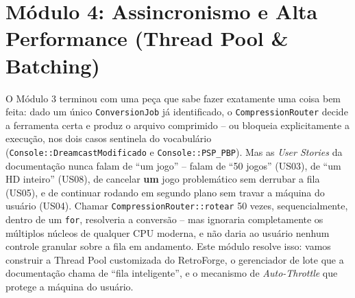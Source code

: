 \section{Módulo 4: Assincronismo e Alta Performance (Thread Pool \& Batching)}

O Módulo 3 terminou com uma peça que sabe fazer exatamente uma coisa bem feita: dado um único \texttt{ConversionJob} já identificado, o \texttt{CompressionRouter} decide a ferramenta certa e produz o arquivo comprimido -- ou bloqueia explicitamente a execução, nos dois casos sentinela do vocabulário (\texttt{Console::DreamcastModificado} e \texttt{Console::PSP\_PBP}). Mas as \textit{User Stories} da documentação nunca falam de ``um jogo'' -- falam de ``50 jogos'' (US03), de ``um HD inteiro'' (US08), de cancelar \textbf{um} jogo problemático sem derrubar a fila (US05), e de continuar rodando em segundo plano sem travar a máquina do usuário (US04). Chamar \texttt{CompressionRouter::rotear} 50 vezes, sequencialmente, dentro de um \texttt{for}, resolveria a conversão -- mas ignoraria completamente os múltiplos núcleos de qualquer CPU moderna, e não daria ao usuário nenhum controle granular sobre a fila em andamento. Este módulo resolve isso: vamos construir a Thread Pool customizada do RetroForge, o gerenciador de lote que a documentação chama de ``fila inteligente'', e o mecanismo de \textit{Auto-Throttle} que protege a máquina do usuário.

